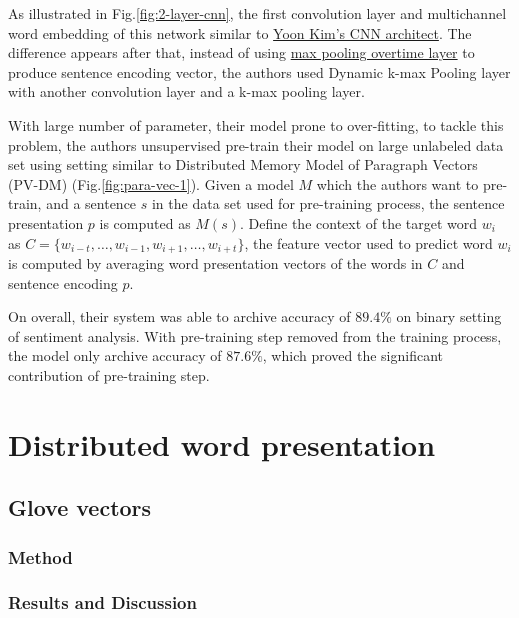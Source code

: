 As illustrated in Fig.\ref{fig:2-layer-cnn}, the first convolution layer and multichannel word embedding of this network similar to \hyperref[kim-cnn]{Yoon Kim's CNN architect}.
The difference appears after that, instead of using  \hyperref[sec:max-overtime-pooling]{max pooling overtime layer} to produce sentence encoding vector, the authors used Dynamic k-max Pooling\cite{deep-cnn-2014} layer with another convolution layer and a k-max pooling layer\cite{deep-cnn-2014}. 

With large number of parameter, their model prone to over-fitting, to tackle this problem, the authors unsupervised pre-train their model on large unlabeled data set using setting similar to Distributed Memory Model of Paragraph Vectors (PV-DM)\cite{ParagraphVec} (Fig.\ref{fig:para-vec-1}).
Given a model \(M\) which the authors want to pre-train, and a sentence \(s\) in the data set used for pre-training process, the sentence presentation \(p\) is computed as \(M(s)\). 
Define the context of the target word \(w_i\) as \(C = \{w_{i-t},\ldots,w_{i-1}, w_{i+1},\ldots,w_{i+t}\}\), the feature vector used to predict word \(w_i\) is computed by averaging word presentation vectors of the words in \(C\) and sentence encoding \(p\)\cite{2-layer-cnn}.
 
On overall, their system was able to archive accuracy of \(89.4\%\) on binary setting of sentiment analysis. 
With pre-training step removed from the training process, the model only archive accuracy of \(87.6\%\), which proved the significant contribution of pre-training step.\cite{2-layer-cnn}



\section{Distributed word presentation}\label{sec:distributed-word}

\subsection{Glove vectors}
\subsubsection{Method}

\subsubsection{Results and Discussion}

